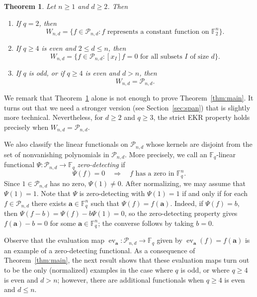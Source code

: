 \documentclass[12pt,reqno]{amsart}
\newtheorem{thm}{Theorem}[section]
\theoremstyle{definition}
\newcommand{\F}{\mathbb{F}}
\newcommand{\cP}{\mathcal P}
\begin{document}
\begin{thm}\label{thm:span}
Let $n\geq1$ and $d\geq2$. Then
\begin{enumerate}[(1)]
\item If $q=2$, then
\[
W_{n,d} =\{f\in\cP_{n,d}:f\text{ represents a constant function on }\F_2^n\}.
\]
\item If $q\geq4$ is even and $2\leq d\leq n$, then 
\[
W_{n,d}=\{f\in\cP_{n,d}: [x_I]f = 0 \text{ for all subsets } I \text{ of size $d$}\}.
\]
\item If $q$ is odd, or if $q\geq4$ is even and $d>n$, then 
\[
W_{n,d}=\cP_{n,d}.
\]
\end{enumerate}
\end{thm}

We remark that Theorem~\ref{thm:span} alone is not enough to prove Theorem~\ref{thm:main}. It turns out that we need a stronger version (see Section~\ref{sec:span}) that is slightly more technical. Nevertheless, for $d\geq 2$ and $q\geq 3$, the strict EKR property holds precisely when $W_{n,d}=\cP_{n,d}$.

We also classify the linear functionals on $\cP_{n,d}$ whose kernels are disjoint from the set of nonvanishing polynomials in $\cP_{n,d}$. More precisely, we call an $\F_q$-linear functional $\Psi\colon \cP_{n,d}\to \F_q$ \emph{zero-detecting} if
\[
\Psi(f)=0 \quad\Longrightarrow\quad f\text{ has a zero in }\F_q^n.
\]    
Since $1\in \cP_{n,d}$ has no zero, $\Psi(1)\neq 0$. After normalizing, we may assume that $\Psi(1)=1$. 
Note that $\Psi$ is zero-detecting with $\Psi(1)=1$ if and only if for each $f\in \cP_{n,d}$ there exists $\mathbf{a}\in \F_q^n$ such that $\Psi(f)=f(\mathbf{a})$. Indeed, if $\Psi(f)=b$, then $\Psi(f-b)=\Psi(f)-b\Psi(1)=0$, so the zero-detecting property gives $f(\mathbf a)-b=0$ for some $\mathbf a\in\F_q^n$; the converse follows by taking $b=0$.

Observe that the evaluation map $\operatorname{ev}_{\mathbf{a}}\colon \cP_{n,d}\to \F_q$ given by $\operatorname{ev}_{\mathbf{a}}(f)=f(\mathbf{a})$ is an example of a zero-detecting functional. As a consequence of Theorem~\ref{thm:main}, the next result shows that these evaluation maps turn out to be the only (normalized) examples in the case where $q$ is odd, or where $q\geq 4$ is even and $d>n$; however, there are additional functionals when $q\geq 4$ is even and $d\leq n$.
\end{document}
